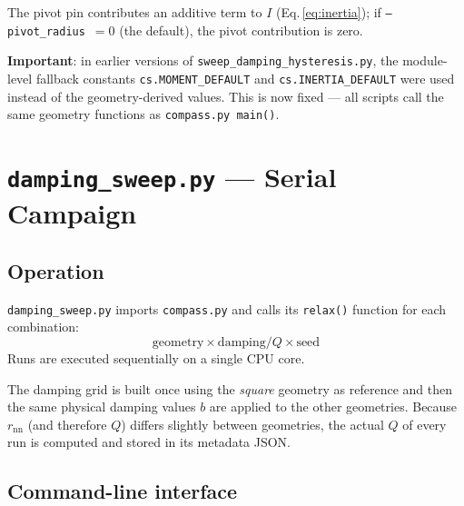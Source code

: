 \documentclass[11pt,a4paper]{article}
\newcommand{\code}[1]{\texttt{#1}}
\newcommand{\file}[1]{\texttt{#1}}
\newcommand{\param}[1]{\texttt{--#1}}
\newcommand{\warn}[1]{\textcolor{warnorange}{\textbf{#1}}}
\begin{document}
\noindent The pivot pin contributes an additive term to $I$ (Eq.\,\ref{eq:inertia});
if \param{pivot\_radius}~$= 0$ (the default), the pivot contribution is zero.

\warn{Important}: in earlier versions of \file{sweep\_damping\_hysteresis.py},
the module-level fallback constants \code{cs.MOMENT\_DEFAULT} and
\code{cs.INERTIA\_DEFAULT} were used instead of the geometry-derived values.
This is now fixed --- all scripts call the same geometry functions as
\code{compass.py\,main()}.

\section{\texttt{damping\_sweep.py} --- Serial Campaign}
\label{sec:v01}

\subsection{Operation}

\file{damping\_sweep.py} imports \texttt{compass.py} and calls its
\code{relax()} function for each combination:
\[
  \text{geometry} \times \text{damping/}Q \times \text{seed}
\]
Runs are executed sequentially on a single CPU core.

The damping grid is built once using the \textit{square} geometry as reference
and then the same physical damping values $b$ are applied to the other
geometries.  Because $r_{\mathrm{nn}}$ (and therefore $Q$) differs slightly
between geometries, the actual $Q$ of every run is computed and stored in its
metadata JSON.

\subsection{Command-line interface}
\end{document}
